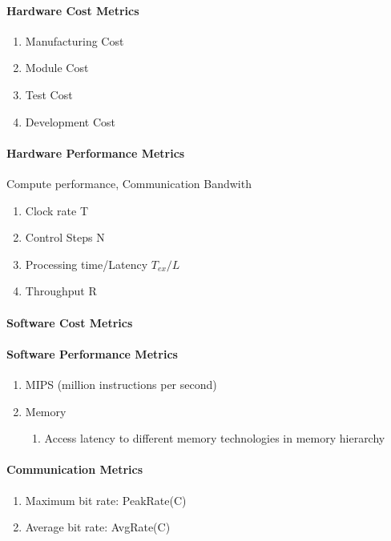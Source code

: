 \documentclass[english]{latex4ei/latex4ei_sheet}
\begin{document}
\paragraph{Hardware Cost Metrics}
\begin{enumerate}
	\item Manufacturing Cost
	\item Module Cost
	\item Test Cost
	\item Development Cost
\end{enumerate}

\paragraph{Hardware Performance Metrics}
Compute performance, Communication Bandwith
\begin{enumerate}
  \item Clock rate T
  \item Control Steps N
  \item Processing time/Latency $T_{ex} / L$
  \item Throughput R
\end{enumerate}
 
\paragraph{Software Cost Metrics}

\paragraph{Software Performance Metrics}
\begin{enumerate}
	\item MIPS (million instructions per second)
	\item Memory
	  \begin{enumerate}
	  	\item Access latency to different memory technologies in memory hierarchy
	  \end{enumerate}
\end{enumerate}

\paragraph{Communication Metrics}
\begin{enumerate}
	\item Maximum bit rate: PeakRate(C)
	\item Average bit rate: AvgRate(C)
\end{enumerate}
\end{document}
